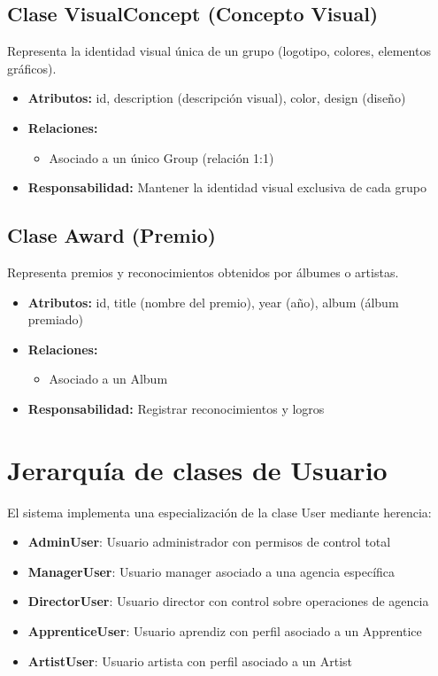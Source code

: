 \documentclass[12pt,a4paper,spanish,oneside]{report}
\begin{document}
\subsection{Clase VisualConcept (Concepto Visual)}
Representa la identidad visual única de un grupo (logotipo, colores, elementos gráficos).

\begin{itemize}
	\item \textbf{Atributos:} id, description (descripción visual), color, design (diseño)
	\item \textbf{Relaciones:}
	\begin{itemize}
		\item Asociado a un único Group (relación 1:1)
	\end{itemize}
	\item \textbf{Responsabilidad:} Mantener la identidad visual exclusiva de cada grupo
\end{itemize}

\subsection{Clase Award (Premio)}
Representa premios y reconocimientos obtenidos por álbumes o artistas.

\begin{itemize}
	\item \textbf{Atributos:} id, title (nombre del premio), year (año), album (álbum premiado)
	\item \textbf{Relaciones:}
	\begin{itemize}
		\item Asociado a un Album
	\end{itemize}
	\item \textbf{Responsabilidad:} Registrar reconocimientos y logros
\end{itemize}

\section{Jerarquía de clases de Usuario}

El sistema implementa una especialización de la clase User mediante herencia:

\begin{itemize}
	\item \textbf{AdminUser}: Usuario administrador con permisos de control total
	\item \textbf{ManagerUser}: Usuario manager asociado a una agencia específica
	\item \textbf{DirectorUser}: Usuario director con control sobre operaciones de agencia
	\item \textbf{ApprenticeUser}: Usuario aprendiz con perfil asociado a un Apprentice
	\item \textbf{ArtistUser}: Usuario artista con perfil asociado a un Artist
\end{itemize}
\end{document}
